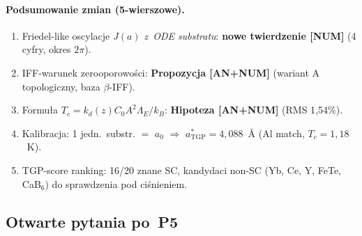 \paragraph{Podsumowanie zmian (5-wierszowe).}
\begin{enumerate}[nosep]
  \item Friedel-like oscylacje $J(a)$ \emph{z~ODE substratu}:
    \textbf{nowe twierdzenie [NUM]} (4 cyfry, okres $2\pi$).
  \item IFF-warunek zerooporowo\'sci: \textbf{Propozycja [AN+NUM]}
    (wariant A topologiczny, baza $\beta$-IFF).
  \item Formu\l{}a $T_c = k_d(z) C_0 A^2 \Lambda_E/k_B$:
    \textbf{Hipoteza [AN+NUM]} (RMS 1{,}54\%).
  \item Kalibracja: 1 jedn.~substr. $=$ $a_0$ $\Rightarrow$ $a^*_\text{TGP} = 4{,}088$~\AA{}
    (Al match, $T_c = 1{,}18$~K).
  \item TGP-score ranking: 16/20 znane SC, kandydaci non-SC
    (Yb, Ce, Y, FeTe, CaB$_6$) do sprawdzenia pod ci\'snieniem.
\end{enumerate}

\subsection{Otwarte pytania po~P5}%
\label{app:P5-open}

